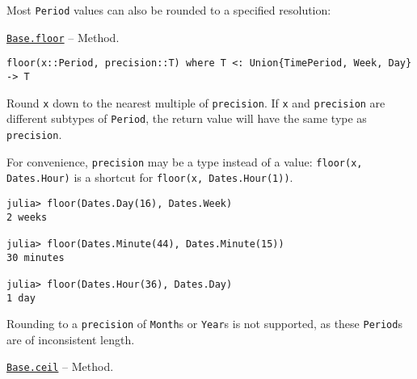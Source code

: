 Most \texttt{Period} values can also be rounded to a specified resolution:


\hypertarget{12778497898812704210}{}
\hyperlink{12778497898812704210}{\texttt{Base.floor}}  -- {Method.}

\begin{adjustwidth}{2em}{0pt}


\begin{verbatim}
floor(x::Period, precision::T) where T <: Union{TimePeriod, Week, Day} -> T
\end{verbatim}

Round \texttt{x} down to the nearest multiple of \texttt{precision}. If \texttt{x} and \texttt{precision} are different subtypes of \texttt{Period}, the return value will have the same type as \texttt{precision}.

For convenience, \texttt{precision} may be a type instead of a value: \texttt{floor(x, Dates.Hour)} is a shortcut for \texttt{floor(x, Dates.Hour(1))}.


\begin{verbatim}
julia> floor(Dates.Day(16), Dates.Week)
2 weeks

julia> floor(Dates.Minute(44), Dates.Minute(15))
30 minutes

julia> floor(Dates.Hour(36), Dates.Day)
1 day
\end{verbatim}

Rounding to a \texttt{precision} of \texttt{Month}s or \texttt{Year}s is not supported, as these \texttt{Period}s are of inconsistent length.



\end{adjustwidth}
\hypertarget{834966372916418370}{}
\hyperlink{834966372916418370}{\texttt{Base.ceil}}  -- {Method.}

